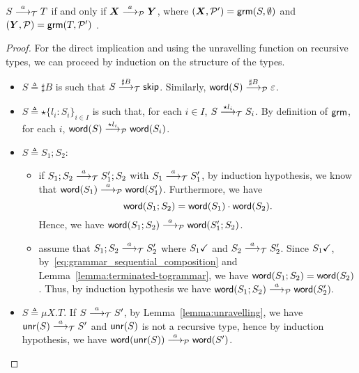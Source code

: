 \newcommand{\grmcontext}{
  $(\vec X, \productions') = \grm(S, \emptyset)$ and 
  $(\vec Y, \productions) = \grm(T, \productions')$%
}

\begin{lemma}
  \label{lem:transitions_mimic}
  $S \LTSderives T$ if and only if $\vec X \LTSderivesP \vec Y$, 
  where \grmcontext.
\end{lemma}
%
\begin{proof}
	For the direct implication and using the unravelling
	function on recursive types, we can proceed by induction
	on the structure of the types. 
	
	\begin{itemize}
		\item $S\triangleq\sharp B$ is such that $S \LTSderives[\sharp B] \skipk$.
		Similarly, $\word(S) \LTSderivesP[\sharp B] \varepsilon$.
		\item $S\triangleq\star\{l_i\colon S_i\}_{i\in I}$ is such that, for each $i\in I$,
		$S \LTSderives[\star l_i] S_i$. By definition of $\grm$, for each $i$, 
		$\word(S) \LTSderivesP[\star l_i] \word(S_i)$.
		\item $S\triangleq S_1;S_2$:
		\begin{itemize}
			\item if $S_1;S_2\LTSderives S_1';S_2$ with $S_1\LTSderives S_1'$,
			by induction hypothesis, we know that $\word(S_1) \LTSderivesP \word(S_1')$.
			Furthermore, we have
			\begin{equation}
			\label{eq:grammar_sequential_composition}
				\word(S_1;S_2) = \word(S_1)\cdot\word(S_2).	
			\end{equation}
			Hence, we have $\word(S_1;S_2) \LTSderivesP \word(S_1';S_2)$.
			\item assume that $S_1;S_2\LTSderives S_2'$ where 
				$\DONE{S_1}$ and $S_2\LTSderives S_2'$.
			Since $\DONE{S_1}$, 
			by~\eqref{eq:grammar_sequential_composition} and
			Lemma~\ref{lemma:terminated-togrammar}, 
			we have $\word(S_1;S_2) = \word(S_2)$.
			Thus, by induction hypothesis we have 
			$\word(S_1;S_2) \LTSderivesP \word(S_2').$
		\end{itemize}
		\item $S\triangleq\mu X.T$. If $S\LTSderives S'$, by Lemma~\ref{lemma:unravelling},
		we have $\Unravel(S) \LTSderives S'$ and $\Unravel(S)$ is not a recursive
		type, hence by induction hypothesis, we have
		$\word(\Unravel(S))\LTSderivesP \word(S')$.

\end{itemize}
\end{proof}
